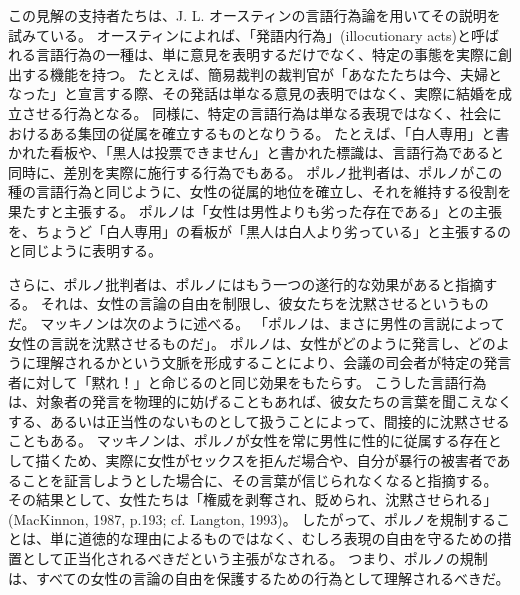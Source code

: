 \documentclass[paper=a4,book,openany]{jlreq}
\begin{document}
この見解の支持者たちは、J. L. オースティンの言語行為論を用いてその説明を試みている。
オースティンによれば、「発語内行為」(illocutionary acts)と呼ばれる言語行為の一種は、単に意見を表明するだけでなく、特定の事態を実際に創出する機能を持つ\citep[pp.116ff, 121, 139]{austin75:_how_to_do_thing_with_words}。
たとえば、簡易裁判の裁判官が「あなたたちは今、夫婦となった」と宣言する際、その発話は単なる意見の表明ではなく、実際に結婚を成立させる行為となる。
同様に、特定の言語行為は単なる表現ではなく、社会におけるある集団の従属を確立するものとなりうる。
たとえば、「白人専用」と書かれた看板や、「黒人は投票できません」と書かれた標識は、言語行為であると同時に、差別を実際に施行する行為でもある。
ポルノ批判者は、ポルノがこの種の言語行為と同じように、女性の従属的地位を確立し、それを維持する役割を果たすと主張する。
ポルノは「女性は男性よりも劣った存在である」との主張を、ちょうど「白人専用」の看板が「黒人は白人より劣っている」と主張するのと同じように表明する。

さらに、ポルノ批判者は、ポルノにはもう一つの遂行的な効果があると指摘する。
それは、女性の言論の自由を制限し、彼女たちを沈黙させるというものだ。
マッキノンは次のように述べる。
「ポルノは、まさに男性の言説によって女性の言説を沈黙させるものだ」\citep[pp.209--209]{mackinnon87:_femin_unmod}。
ポルノは、女性がどのように発言し、どのように理解されるかという文脈を形成することにより、会議の司会者が特定の発言者に対して「黙れ！」と命じるのと同じ効果をもたらす。
こうした言語行為は、対象者の発言を物理的に妨げることもあれば、彼女たちの言葉を聞こえなくする、あるいは正当性のないものとして扱うことによって、間接的に沈黙させることもある。
マッキノンは、ポルノが女性を常に男性に性的に従属する存在として描くため、実際に女性がセックスを拒んだ場合や、自分が暴行の被害者であることを証言しようとした場合に、その言葉が信じられなくなると指摘する。
その結果として、女性たちは「権威を剥奪され、貶められ、沈黙させられる」(MacKinnon, 1987, p.193; cf. Langton, 1993)\nocite{langton93:_speec_acts_and_unspeak_acts}。
したがって、ポルノを規制することは、単に道徳的な理由によるものではなく、むしろ表現の自由を守るための措置として正当化されるべきだという主張がなされる。
つまり、ポルノの規制は、すべての女性の言論の自由を保護するための行為として理解されるべきだ。
\end{document}
